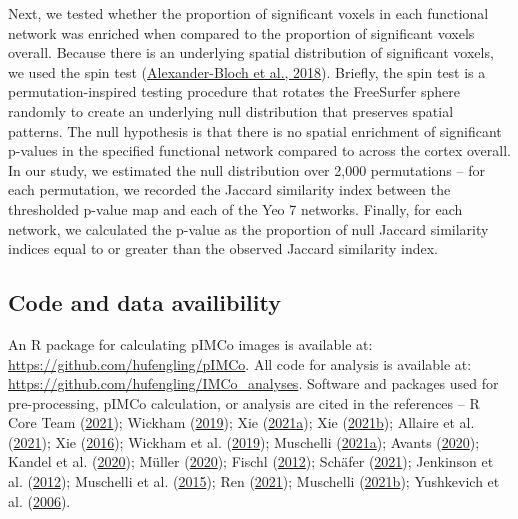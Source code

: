 \documentclass[
  12pt,
]{article}
\begin{document}
Next, we tested whether the proportion of significant voxels in each functional network was enriched when compared to the proportion of significant voxels overall. Because there is an underlying spatial distribution of significant voxels, we used the spin test (\protect\hyperlink{ref-alexander-bloch_testing_2018}{Alexander-Bloch et al., 2018}). Briefly, the spin test is a permutation-inspired testing procedure that rotates the FreeSurfer sphere randomly to create an underlying null distribution that preserves spatial patterns. The null hypothesis is that there is no spatial enrichment of significant p-values in the specified functional network compared to across the cortex overall. In our study, we estimated the null distribution over 2,000 permutations -- for each permutation, we recorded the Jaccard similarity index between the thresholded p-value map and each of the Yeo 7 networks. Finally, for each network, we calculated the p-value as the proportion of null Jaccard similarity indices equal to or greater than the observed Jaccard similarity index.

\hypertarget{code-and-data-availibility}{%
\subsection{Code and data availibility}\label{code-and-data-availibility}}

An R package for calculating pIMCo images is available at: \url{https://github.com/hufengling/pIMCo}. All code for analysis is available at: \url{https://github.com/hufengling/IMCo_analyses}. Software and packages used for pre-processing, pIMCo calculation, or analysis are cited in the references -- R Core Team (\protect\hyperlink{ref-R-base}{2021}); Wickham (\protect\hyperlink{ref-stringr}{2019}); Xie (\protect\hyperlink{ref-R-bookdown}{2021a}); Xie (\protect\hyperlink{ref-R-knitr}{2021b}); Allaire et al. (\protect\hyperlink{ref-R-rmarkdown}{2021}); Xie (\protect\hyperlink{ref-bookdown2016}{2016}); Wickham et al. (\protect\hyperlink{ref-tidyverse}{2019}); Muschelli (\protect\hyperlink{ref-extrantsr}{2021a}); Avants (\protect\hyperlink{ref-antsr}{2020}); Kandel et al. (\protect\hyperlink{ref-antsrcore}{2020}); Müller (\protect\hyperlink{ref-here}{2020}); Fischl (\protect\hyperlink{ref-fischl2012freesurfer}{2012}); Schäfer (\protect\hyperlink{ref-fsformats}{2021}); Jenkinson et al. (\protect\hyperlink{ref-jenkinson2012fsl}{2012}); Muschelli et al. (\protect\hyperlink{ref-muschelli2015fslr}{2015}); Ren (\protect\hyperlink{ref-rlist}{2021}); Muschelli (\protect\hyperlink{ref-neurobase}{2021b}); Yushkevich et al. (\protect\hyperlink{ref-py06nimg}{2006}).
\end{document}
